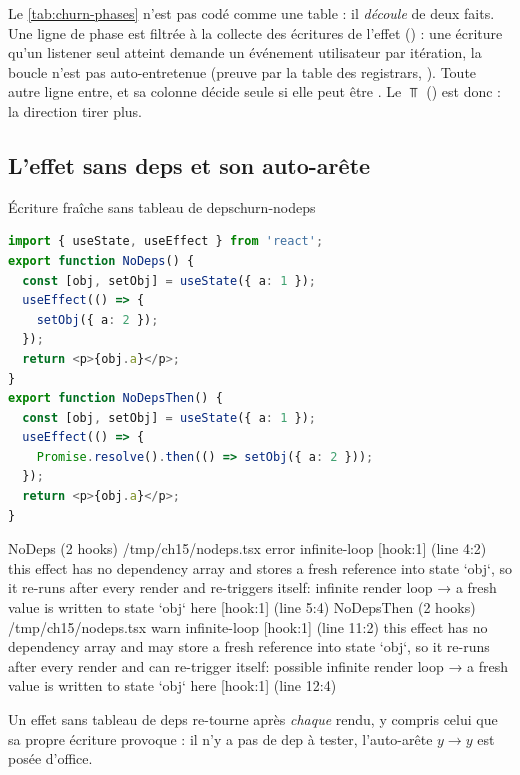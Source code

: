 Le \cref{tab:churn-phases} n'est pas codé comme une table : il \emph{découle} de deux
faits. Une ligne de phase  est filtrée à la collecte des écritures de l'effet
() : une écriture qu'un listener seul atteint demande un
événement utilisateur par itération, la boucle n'est pas auto-entretenue (preuve par la table
des registrars, ). Toute autre ligne entre, et sa colonne  décide
seule si elle peut être . Le $\Top$ () est donc  : la
direction \og tirer plus\fg.

\subsection{L'effet sans deps et son auto-arête}

\begin{exemple}{Écriture fraîche sans tableau de deps}{churn-nodeps}
\begin{lstlisting}[language=TypeScript,caption={\file{/tmp/ch15/nodeps.tsx}},label={lst:churn-nodeps}]
import { useState, useEffect } from 'react';
export function NoDeps() {
  const [obj, setObj] = useState({ a: 1 });
  useEffect(() => {
    setObj({ a: 2 });
  });
  return <p>{obj.a}</p>;
}
export function NoDepsThen() {
  const [obj, setObj] = useState({ a: 1 });
  useEffect(() => {
    Promise.resolve().then(() => setObj({ a: 2 }));
  });
  return <p>{obj.a}</p>;
}
\end{lstlisting}
\begin{sortie}
  NoDeps  (2 hooks)  /tmp/ch15/nodeps.tsx
    error  infinite-loop  [hook:1]  (line 4:2)  this effect has no dependency array and stores a fresh reference into state `obj`, so it re-runs after every render and re-triggers itself: infinite render loop
       → a fresh value is written to state `obj` here [hook:1] (line 5:4)
  NoDepsThen  (2 hooks)  /tmp/ch15/nodeps.tsx
    warn   infinite-loop  [hook:1]  (line 11:2)  this effect has no dependency array and may store a fresh reference into state `obj`, so it re-runs after every render and can re-trigger itself: possible infinite render loop
       → a fresh value is written to state `obj` here [hook:1] (line 12:4)
\end{sortie}
\end{exemple}

Un effet sans tableau de deps re-tourne après \emph{chaque} rendu, y compris celui que sa
propre écriture provoque : il n'y a pas de dep à tester, l'auto-arête $y \to y$ est posée
d'office.

